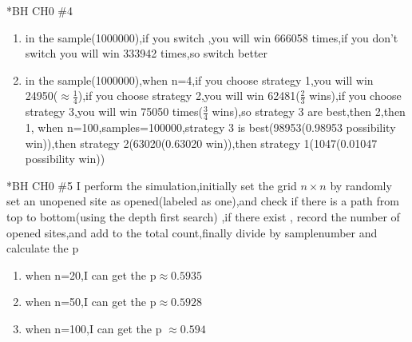 \documentclass{article}
\begin{document}
\begin{homeworkProblem}*{BH CH0 \#4}
	\begin{enumerate}
		\item in the sample(1000000),if you switch ,you will win 666058 times,if you don't switch you will win 333942 times,so switch better
		\item in the sample(1000000),when n=4,if you choose strategy 1,you will win 24950($\approx\frac{1}{4}$),if you choose strategy 2,you will win 62481($\frac{2}{3}$ wins),if you choose strategy 3,you will win 75050 times($\frac{3}{4}$ wins),so strategy 3 are best,then 2,then 1, when n=100,samples=100000,strategy 3 is best(98953(0.98953 possibility win)),then strategy 2(63020(0.63020 win)),then strategy 1(1047(0.01047 possibility win))
	\end{enumerate}
\end{homeworkProblem}

\begin{homeworkProblem}*{BH CH0 \#5}
	I perform the simulation,initially set the grid $n\times n$
	by randomly set an unopened site as opened(labeled as one),and check if there 
	is a path from top to bottom(using the depth first search) ,if there exist ,
	record the number of opened sites,and add to the total count,finally divide by samplenumber and calculate the p
	\begin{enumerate}
\item when n=20,I can get the p$\approx 0.5935$
\item when n=50,I can get the p$\approx 0.5928$
\item when n=100,I can get the p $\approx 0.594$
	\end{enumerate}
\end{homeworkProblem}
\end{document}

